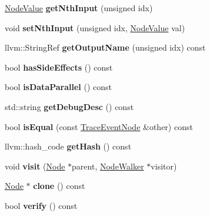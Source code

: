 \begin{DoxyCompactItemize}
\item 
\mbox{\label{classglow_1_1_trace_event_node_ae69ed0aaf692c95cbdcfc46f644a980c}} 
\hyperlink{structglow_1_1_node_value}{Node\+Value} {\bfseries get\+Nth\+Input} (unsigned idx)
\item 
\mbox{\label{classglow_1_1_trace_event_node_aa32084fd3de23ee3dfd111af1b8e6882}} 
void {\bfseries set\+Nth\+Input} (unsigned idx, \hyperlink{structglow_1_1_node_value}{Node\+Value} val)
\item 
\mbox{\label{classglow_1_1_trace_event_node_abedfa37bc8139045892e27f56e40ba38}} 
llvm\+::\+String\+Ref {\bfseries get\+Output\+Name} (unsigned idx) const
\item 
\mbox{\label{classglow_1_1_trace_event_node_a8de40f5be57fa41dd7516805750485fe}} 
bool {\bfseries has\+Side\+Effects} () const
\item 
\mbox{\label{classglow_1_1_trace_event_node_a6949530a56f1a803c3f5c88f9f3ad17e}} 
bool {\bfseries is\+Data\+Parallel} () const
\item 
\mbox{\label{classglow_1_1_trace_event_node_afa4939883d530de7d5b04ae8dd2a6540}} 
std\+::string {\bfseries get\+Debug\+Desc} () const
\item 
\mbox{\label{classglow_1_1_trace_event_node_af5d33f97c0fe598dfaa423bd5a66fd9e}} 
bool {\bfseries is\+Equal} (const \hyperlink{classglow_1_1_trace_event_node}{Trace\+Event\+Node} \&other) const
\item 
\mbox{\label{classglow_1_1_trace_event_node_add241b15e45bf016ebc322055ecfed4d}} 
llvm\+::hash\+\_\+code {\bfseries get\+Hash} () const
\item 
\mbox{\label{classglow_1_1_trace_event_node_a0836a3142d66fd21989c737d75e865c8}} 
void {\bfseries visit} (\hyperlink{classglow_1_1_node}{Node} $\ast$parent, \hyperlink{classglow_1_1_node_walker}{Node\+Walker} $\ast$visitor)
\item 
\mbox{\label{classglow_1_1_trace_event_node_a148860716955bf577e5f6e8bf97c86e8}} 
\hyperlink{classglow_1_1_node}{Node} $\ast$ {\bfseries clone} () const
\item 
\mbox{\label{classglow_1_1_trace_event_node_aa885476548a1d00d014fec3c6f8a5853}} 
bool {\bfseries verify} () const
\end{DoxyCompactItemize}

